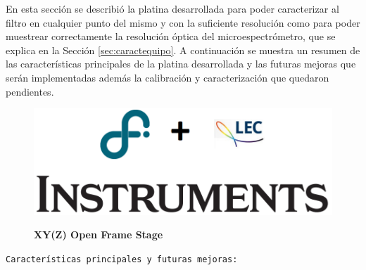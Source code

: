 En esta sección se describió la platina desarrollada para poder caracterizar al filtro en cualquier punto del mismo y con la suficiente resolución como para poder muestrear correctamente la resolución óptica del microespectrómetro, que se explica en la Sección \ref{sec:caractequipo}. A continuación se muestra un resumen de las características principales de la platina desarrollada y las futuras mejoras que serán implementadas además la calibración y caracterización que quedaron pendientes.

\newpage
\begin{figure}[H]
\begin{minipage}{0.47\textwidth}
\centering
\includegraphics[width=.7\textwidth,left]{Figs/microespectrometro/descarga.png}
\end{minipage}
\hfill
\begin{minipage}{0.47\textwidth}
\raggedleft
\Huge \textbf{XY(Z) Open Frame Stage}
\end{minipage}
\end{figure}

\texttt{Características principales y futuras mejoras:}

